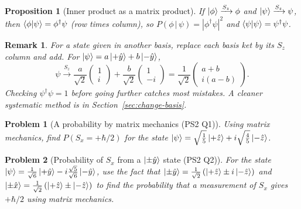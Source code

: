 \documentclass{article}
\newtheorem{problem}{Problem}
\newtheorem{remark}{Remark}
\newtheorem{proposition}{Proposition}
\begin{document}
\begin{proposition}[Inner product as a matrix product]
    If $\ket{\phi} \xrightarrow{S_z} \phi$ and $\ket{\psi} \xrightarrow{S_z} \psi$, then $\braket{\phi|\psi} = \phi^\dagger\psi$ (row times column), so $P(\phi\,|\,\psi) = \left|\phi^\dagger\psi\right|^2$ and $\braket{\psi|\psi} = \psi^\dagger\psi$.
\end{proposition}
\begin{remark}
    For a state given in another basis, replace each basis ket by its $S_z$ column and add. For $\ket{\psi} = a\ket{+\hat{y}} + b\ket{-\hat{y}}$,
    \[\psi \xrightarrow{S_z} \frac{a}{\sqrt{2}}\begin{pmatrix} 1 \\ i \end{pmatrix} + \frac{b}{\sqrt{2}}\begin{pmatrix} 1 \\ -i \end{pmatrix} = \frac{1}{\sqrt{2}}\begin{pmatrix} a+b \\ i(a-b) \end{pmatrix}.\]
    Checking $\psi^\dagger\psi = 1$ before going further catches most mistakes. A cleaner systematic method is in Section~\ref{sec:change-basis}.
\end{remark}
\begin{problem}[A probability by matrix mechanics (PS2 Q1)]
    Using matrix mechanics, find $P(S_x = +\hbar/2)$ for the state $\ket{\psi} = \sqrt{\tfrac{1}{5}}\ket{+\hat{z}} + i\sqrt{\tfrac{4}{5}}\ket{-\hat{z}}$.
\end{problem}
\begin{problem}[Probability of $S_x$ from a $\ket{\pm\hat{y}}$ state (PS2 Q2)]
    For the state $\ket{\psi} = \frac{1}{\sqrt{6}}\ket{+\hat{y}} - i\frac{\sqrt{5}}{\sqrt{6}}\ket{-\hat{y}}$, use the fact that $\ket{\pm\hat{y}} = \frac{1}{\sqrt{2}}\left(\ket{+\hat{z}} \pm i\ket{-\hat{z}}\right)$ and $\ket{\pm\hat{x}} = \frac{1}{\sqrt{2}}\left(\ket{+\hat{z}} \pm \ket{-\hat{z}}\right)$ to find the probability that a measurement of $S_x$ gives $+\hbar/2$ using matrix mechanics.
\end{problem}
\end{document}
